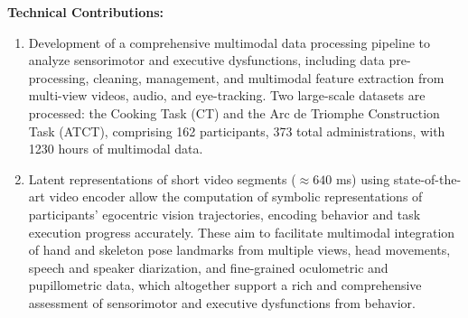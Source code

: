\begin{chapterabstract}
\begin{enumerate}
    \end{enumerate}

    \textbf{Technical Contributions:}
    \begin{enumerate}
        \item Development of a comprehensive multimodal data processing pipeline to analyze sensorimotor and executive dysfunctions, including data pre-processing, cleaning, management, and multimodal feature extraction from multi-view videos, audio, and eye-tracking. Two large-scale datasets are processed: the Cooking Task (CT) and the Arc de Triomphe Construction Task (ATCT), comprising 162 participants, 373 total administrations, with 1230 hours of multimodal data.

        \item Latent representations of short video segments ($\approx 640$ ms) using state-of-the-art video encoder allow the computation of symbolic representations of participants' egocentric vision trajectories, encoding behavior and task execution progress accurately. These aim to facilitate multimodal integration of hand and skeleton pose landmarks from multiple views, head movements, speech and speaker diarization, and fine-grained oculometric and pupillometric data, which altogether support a rich and comprehensive assessment of sensorimotor and executive dysfunctions from behavior.



        
        



\end{enumerate}
\end{chapterabstract}
